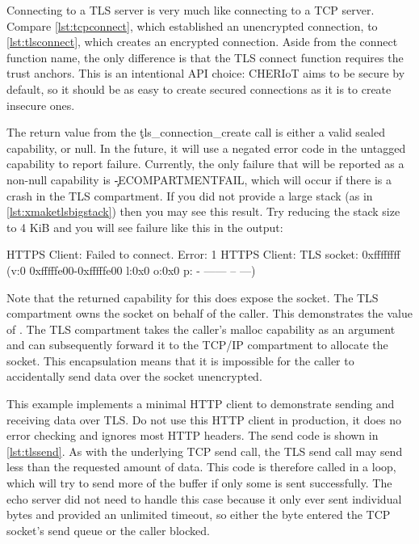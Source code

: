 \codelisting[filename=examples/tls/https.cc,marker=setup,label=lst:tlssetup,caption="Setup required before a TLS connection is possible."]{}

Connecting to a TLS server is very much like connecting to a TCP server.
Compare \ref{lst:tcpconnect}, which established an unencrypted connection, to \ref{lst:tlsconnect}, which creates an encrypted connection.
Aside from the connect function name, the only difference is that the TLS connect function requires the trust anchors.
This is an intentional API choice: CHERIoT aims to be secure by default, so it should be as easy to create secured connections as it is to create insecure ones.

\codelisting[filename=examples/tls/https.cc,marker=tls_connect,label=lst:tlsconnect,caption="Connecting to a remote server with TLS."]{}

The return value from the \c{tls_connection_create} call is either a valid sealed capability, or null.
In the future, it will use a negated error code in the untagged capability to report failure.
Currently, the only failure that will be reported as a non-null capability is \c{-ECOMPARTMENTFAIL}, which will occur if there is a crash in the TLS compartment.
If you did not provide a large stack (as in \ref{lst:xmaketlsbigstack}) then you may see this result.
Try reducing the stack size to 4 KiB and you will see failure like this in the output:

\begin{console}
HTTPS Client: Failed to connect.  Error: 1
HTTPS Client: TLS socket: 0xffffffff (v:0 0xfffffe00-0xfffffe00 l:0x0 o:0x0 p: - ------ -- ---)
\end{console}

Note that the returned capability for this does  expose the socket.
The TLS compartment owns the socket on behalf of the caller.
This demonstrates the value of .
The TLS compartment takes the caller's malloc capability as an argument and can subsequently forward it to the TCP/IP compartment to allocate the socket.
This encapsulation means that it is impossible for the caller to accidentally send data over the socket unencrypted.

This example implements a minimal HTTP client to demonstrate sending and receiving data over TLS.
Do not use this HTTP client in production, it does no error checking and ignores most HTTP headers.
The send code is shown in \ref{lst:tlssend}.
As with the underlying TCP send call, the TLS send call may send less than the requested amount of data.
This code is therefore called in a loop, which will try to send more of the buffer if only some is sent successfully.
The echo server did not need to handle this case because it only ever sent individual bytes and provided an unlimited timeout, so either the byte entered the TCP socket's send queue or the caller blocked.

